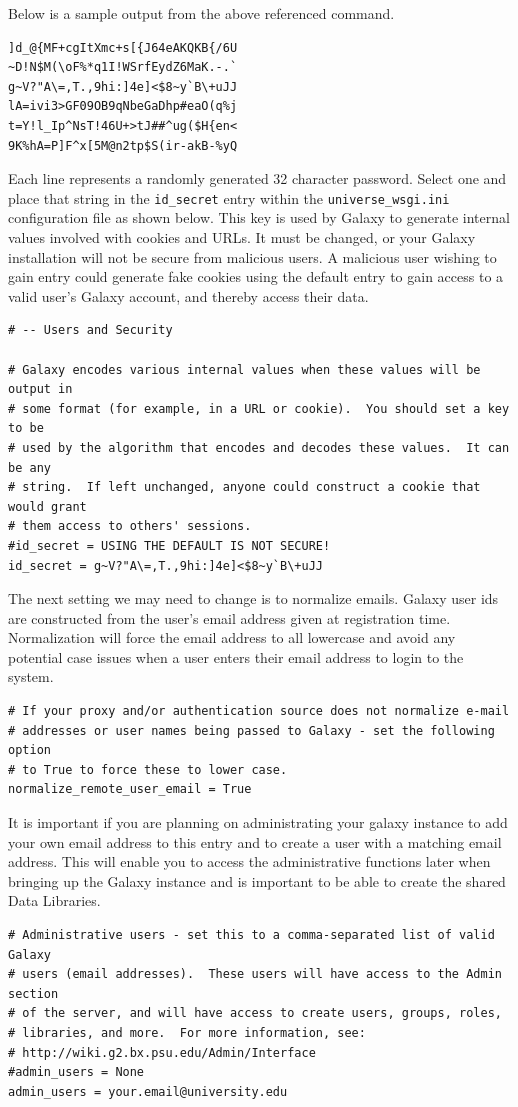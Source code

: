 \documentclass[a4paper,10pt]{article}
\begin{document}
Below is a sample output from the above referenced command.

\begin{lstlisting}
]d_@{MF+cgItXmc+s[{J64eAKQKB{/6U
~D!N$M(\oF%*q1I!WSrfEydZ6MaK.-.`
g~V?"A\=,T.,9hi:]4e]<$8~y`B\+uJJ
lA=ivi3>GF09OB9qNbeGaDhp#eaO(q%j
t=Y!l_Ip^NsT!46U+>tJ##^ug($H{en<
9K%hA=P]F^x[5M@n2tp$S(ir-akB-%yQ
\end{lstlisting}

Each line represents a randomly generated 32 character password.  Select one and place that string in the \texttt{\footnotesize{id\_secret}} entry within the \texttt{\footnotesize{universe\_wsgi.ini}} configuration file as shown below.  This key is used by Galaxy to generate internal values involved with cookies and URLs.  It must be changed, or your Galaxy installation will not be secure from malicious users.   A malicious user wishing to gain entry could generate fake cookies using the default entry to gain access to a valid user's Galaxy account, and thereby access their data.

\begin{lstlisting}
# -- Users and Security

# Galaxy encodes various internal values when these values will be output in
# some format (for example, in a URL or cookie).  You should set a key to be
# used by the algorithm that encodes and decodes these values.  It can be any
# string.  If left unchanged, anyone could construct a cookie that would grant
# them access to others' sessions.
#id_secret = USING THE DEFAULT IS NOT SECURE!
id_secret = g~V?"A\=,T.,9hi:]4e]<$8~y`B\+uJJ
\end{lstlisting}

The next setting we may need to change is to normalize emails.  Galaxy user ids are constructed from the user's email address given at registration time.  Normalization will force the email address to all lowercase and avoid any potential case issues when a user enters their email address to login to the system.

\begin{lstlisting}
# If your proxy and/or authentication source does not normalize e-mail
# addresses or user names being passed to Galaxy - set the following option
# to True to force these to lower case.
normalize_remote_user_email = True
\end{lstlisting}

It is important if you are planning on administrating your galaxy instance to add your own email address to this entry and to create a user with a matching email address.  This will enable you to access the administrative functions later when bringing up the Galaxy instance and is important to be able to create the shared Data Libraries.
\begin{lstlisting}
# Administrative users - set this to a comma-separated list of valid Galaxy
# users (email addresses).  These users will have access to the Admin section
# of the server, and will have access to create users, groups, roles,
# libraries, and more.  For more information, see:
# http://wiki.g2.bx.psu.edu/Admin/Interface
#admin_users = None
admin_users = your.email@university.edu
\end{lstlisting}
\end{document}
